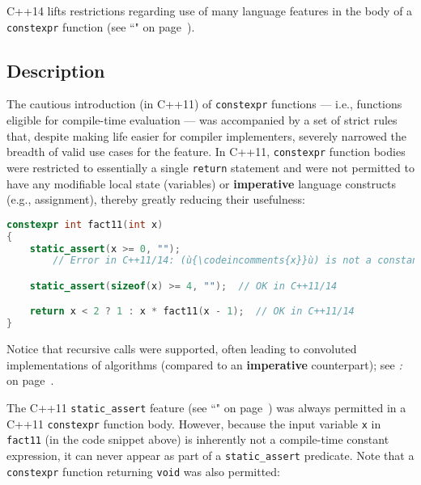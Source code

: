 
C++14 lifts restrictions regarding use of many language features in the
body of a \texttt{constexpr} function (see ``" on page~\pageref{constexprfunc}).

\subsection[Description]{Description}\label{description}

The cautious introduction (in C++11) of \texttt{constexpr}
functions --- i.e., functions eligible for compile-time evaluation
--- was accompanied by a set of strict rules that, despite making life
easier for compiler implementers, severely narrowed the breadth of valid
use cases for the feature. In C++11, \texttt{constexpr}
function bodies were restricted to essentially a single
\texttt{return} statement and were not permitted to have any modifiable
local state (variables) or \textbf{imperative} language constructs
(e.g., assignment), thereby greatly reducing their \mbox{usefulness}:

\begin{lstlisting}[language=C++]
constexpr int fact11(int x)
{
    static_assert(x >= 0, "");
        // Error in C++11/14: (ù{\codeincomments{x}}ù) is not a constant expression.

    static_assert(sizeof(x) >= 4, "");  // OK in C++11/14

    return x < 2 ? 1 : x * fact11(x - 1);  // OK in C++11/14
}
\end{lstlisting}

\noindent Notice that recursive calls were supported, often leading to convoluted
implementations of algorithms (compared to an \textbf{imperative}
counterpart); see \textit{: } on page~\pageref{non-recursive-constexpr-algorithms}.

The C++11 \texttt{static\_assert} feature (see ``" on page~\pageref{compile-time-assertions-(static_assert)}) was always
permitted in a C++11 \texttt{constexpr} function body.
However, because the input variable \texttt{x} in \texttt{fact11}
(in the code snippet above) is inherently not a compile-time constant expression, it can
never appear as part of a \texttt{static\_assert} predicate. Note that a
\texttt{constexpr} function returning \texttt{void} was also permitted:

